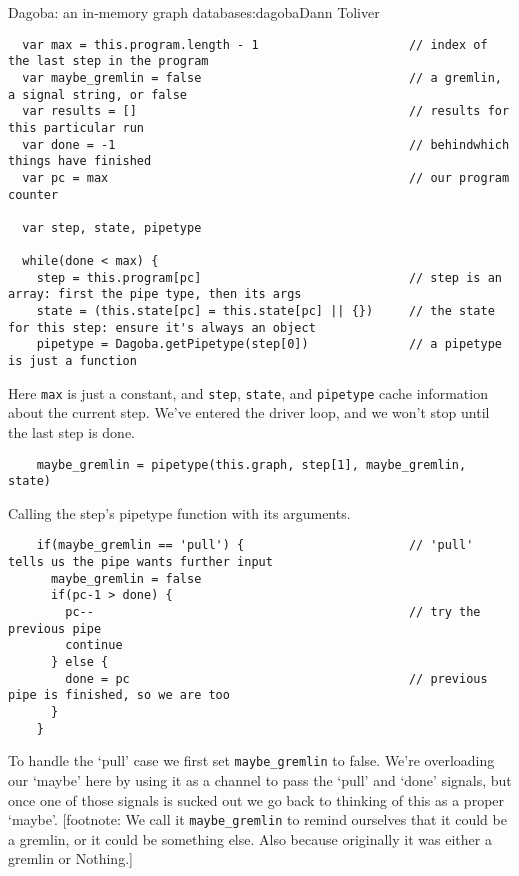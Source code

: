 \begin{aosachapter}{Dagoba: an in-memory graph database}{s:dagoba}{Dann Toliver}
\begin{verbatim}
  var max = this.program.length - 1                     // index of the last step in the program
  var maybe_gremlin = false                             // a gremlin, a signal string, or false
  var results = []                                      // results for this particular run
  var done = -1                                         // behindwhich things have finished
  var pc = max                                          // our program counter

  var step, state, pipetype

  while(done < max) {
    step = this.program[pc]                             // step is an array: first the pipe type, then its args
    state = (this.state[pc] = this.state[pc] || {})     // the state for this step: ensure it's always an object
    pipetype = Dagoba.getPipetype(step[0])              // a pipetype is just a function
\end{verbatim}

Here \texttt{max} is just a constant, and \texttt{step}, \texttt{state},
and \texttt{pipetype} cache information about the current step. We've
entered the driver loop, and we won't stop until the last step is done.

\begin{verbatim}
    maybe_gremlin = pipetype(this.graph, step[1], maybe_gremlin, state)
\end{verbatim}

Calling the step's pipetype function with its arguments.

\begin{verbatim}
    if(maybe_gremlin == 'pull') {                       // 'pull' tells us the pipe wants further input
      maybe_gremlin = false
      if(pc-1 > done) {
        pc--                                            // try the previous pipe
        continue
      } else {
        done = pc                                       // previous pipe is finished, so we are too
      }
    }
\end{verbatim}

To handle the `pull' case we first set \texttt{maybe\_gremlin} to false.
We're overloading our `maybe' here by using it as a channel to pass the
`pull' and `done' signals, but once one of those signals is sucked out
we go back to thinking of this as a proper `maybe'. {[}footnote: We call
it \texttt{maybe\_gremlin} to remind ourselves that it could be a
gremlin, or it could be something else. Also because originally it was
either a gremlin or Nothing.{]}


\end{aosachapter}
